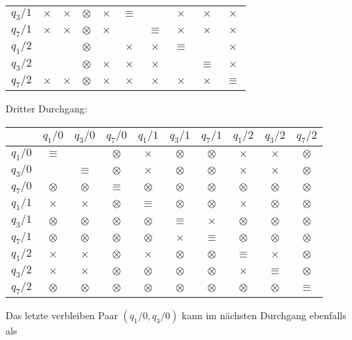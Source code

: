\begin{loesung}
\begin{teilaufgaben}
\begin{center}
\begin{tabular}{|c|ccccccccc|}
$q_3/1$  &$\times$ &$\times$ &$\otimes$&$\times$ &$\equiv$ &         &$\times$ &$\times$ &$\times$ \\
$q_7/1$  &$\times$ &$\times$ &$\otimes$&$\times$ &         &$\equiv$ &$\times$ &$\times$ &$\times$ \\
$q_1/2$  &         &         &$\otimes$&         &$\times$ &$\times$ &$\equiv$ &         &$\times$ \\
$q_3/2$  &         &         &$\otimes$&$\times$ &$\times$ &$\times$ &         &$\equiv$ &$\times$ \\
$q_7/2$  &$\times$ &$\times$ &$\otimes$&$\times$ &$\times$ &$\times$ &$\times$ &$\times$ &$\equiv$ \\
\hline
\end{tabular}
\end{center}
Dritter Durchgang:
\begin{center}
\begin{tabular}{|c|ccccccccc|}
\hline
         &$q_1/0$  &$q_3/0$  &$q_7/0$  &$q_1/1$  &$q_3/1$  &$q_7/1$  &$q_1/2$  &$q_3/2$  &$q_7/2$  \\
\hline
$q_1/0$  &$\equiv$ &         &$\otimes$&$\times$ &$\otimes$&$\otimes$&$\times$ &$\times$ &$\otimes$\\
$q_3/0$  &         &$\equiv$ &$\otimes$&$\times$ &$\otimes$&$\otimes$&$\times$ &$\times$ &$\otimes$\\
$q_7/0$  &$\otimes$&$\otimes$&$\equiv$ &$\otimes$&$\otimes$&$\otimes$&$\otimes$&$\otimes$&$\otimes$\\
$q_1/1$  &$\times$ &$\times$ &$\otimes$&$\equiv$ &$\otimes$&$\otimes$&$\times$ &$\otimes$&$\otimes$\\
$q_3/1$  &$\otimes$&$\otimes$&$\otimes$&$\otimes$&$\equiv$ &$\times$ &$\otimes$&$\otimes$&$\otimes$\\
$q_7/1$  &$\otimes$&$\otimes$&$\otimes$&$\otimes$&$\times$ &$\equiv$ &$\otimes$&$\otimes$&$\otimes$\\
$q_1/2$  &$\times$ &$\times$ &$\otimes$&$\times$ &$\otimes$&$\otimes$&$\equiv$ &$\times$ &$\otimes$\\
$q_3/2$  &$\times$ &$\times$ &$\otimes$&$\otimes$&$\otimes$&$\otimes$&$\times$ &$\equiv$ &$\otimes$\\
$q_7/2$  &$\otimes$&$\otimes$&$\otimes$&$\otimes$&$\otimes$&$\otimes$&$\otimes$&$\otimes$&$\equiv$ \\
\hline
\end{tabular}
\end{center}
Das letzte verbleiben Paar $(q_1/0,q_3/0)$ kann im nächsten Durchgang ebenfalls als

\end{teilaufgaben}
\end{loesung}
